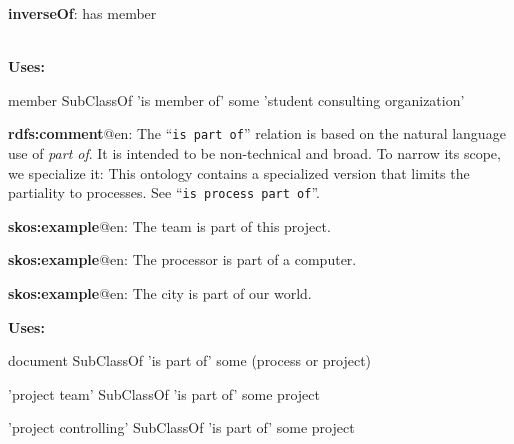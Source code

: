 \documentclass[a4paper, DIV=13, BCOR=0cm]{scrbook}
\newcommand{\relation}[1]{\texttt{#1}}
\begin{document}
\begin{mdframed}[style=onto, frametitle={is member of}]
	{%
		\begin{compactitem}
			\item \textbf{inverseOf}: has member
		\end{compactitem}
		\hrulefill\\
		\textbf{Uses:}
		\begin{compactitem}
			\item member SubClassOf 'is member of' some 'student consulting organization'
		\end{compactitem}
	} %
\end{mdframed}

\begin{mdframed}[style=onto, frametitle={is part of}]
	
{%
		\begin{compactitem}
			\item \textbf{rdfs:comment}@en: The \enquote{\relation{is part of}} relation is based on the natural language use of \textit{part of}. It is intended to be non-technical and broad. To narrow its scope, we specialize it: This ontology contains a specialized version that limits the partiality to processes. See \enquote{\relation{is process part of}}.
			\item \textbf{skos:example}@en: The team is part of this project.
			\item \textbf{skos:example}@en: The processor is part of a computer.
			\item \textbf{skos:example}@en: The city is part of our world.
		\end{compactitem}
		\textbf{Uses:}
		\begin{compactitem}
			\item document SubClassOf 'is part of' some 
			(process or project)
			\item 'project team' SubClassOf 'is part of' some project
			\item 'project controlling' SubClassOf 'is part of' some project
		\end{compactitem}
	} %
\end{mdframed}
\end{document}
